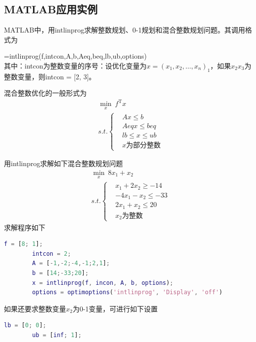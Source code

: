     \subsection{MATLAB应用实例}
        \par
        MATLAB中，用intlinprog求解整数规划、0-1规划和混合整数规划问题。其调用格式为
        \par
        [x,fval,exitflag,output]=intlinprog(f,intcon,A,b,Aeq,beq,lb,ub,options)\\
        其中：intcon为整数变量的序号：设优化变量为$x=(x_1,x_2,\ldots,x_n)_1$，如果$x_2x_3$为整数变量，则intcon = [2, 3]。
        \par
        混合整数优化的一般形式为
        \begin{align*}
        &\mathop {\min}\limits_x\  f^\mathrm{T} x\\
        &s.t.\left\{
        \begin{aligned}
        &Ax \leqslant b\\
        &Aeq x \leqslant beq\\
        &lb \leqslant x \leqslant ub\\
        &x\text{为部分整数}
        \end{aligned}
        \right.
        \end{align*}
        \par
        用intlinprog求解如下混合整数规划问题
        \begin{align*}
        &\mathop {\min}\limits_x \  8 x_1+x_2\\
        &s.t.\left\{
        \begin{aligned}
        &x_1+2x_2 \geqslant -14\\
        &-4x_1-x_2 \leqslant -33\\
        &2x_1+x_2 \leqslant 20\\
        &x_2\text{为整数}
        \end{aligned}
        \right.
        \end{align*}
        求解程序如下
        \begin{lstlisting}[language=Matlab]
        f = [8; 1];
        intcon = 2;
        A = [-1,-2;-4,-1;2,1];
        b = [14;-33;20];
        x = intlinprog(f, incon, A, b, options);
        options = optimoptions('intlinprog', 'Display', 'off')
        \end{lstlisting}
        \par
        如果还要求整数变量$x_2$为0-1变量，可进行如下设置
        \begin{lstlisting}[language=Matlab]
        lb = [0; 0];
        ub = [inf; 1];
        \end{lstlisting}
